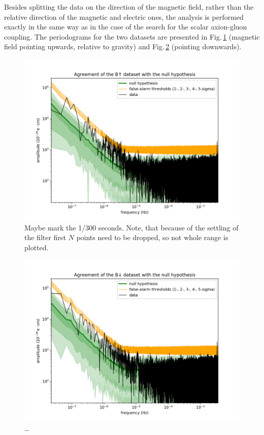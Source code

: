 Besides splitting the data on the direction of the magnetic field, rather than the relative direction of the magnetic and electric ones, the analysis is performed exactly in the same way as in the case of the search for the scalar axion-gluon coupling. The periodograms for the two datasets are presented in Fig.\,\ref{fig:axions_wind_Bup_detection} (magnetic field pointing upwards, relative to gravity) and Fig.\,\ref{fig:axions_wind_Bdown_detection} (pointing downwards).

\begin{figure}
  \centering
  \includegraphics[width=0.9\linewidth]{gfx/axions/winddeltah4mm_Bup_detection.png}
  \caption{Maybe mark the 1/300 seconds. Note, that because of the settling of the filter first $N$ points need to be dropped, so not whole range is plotted.}
  \label{fig:axions_wind_Bup_detection}
\end{figure}

\begin{figure}
  \centering
  \includegraphics[width=0.9\linewidth]{gfx/axions/winddeltah4mm_Bdown_detection.png}
  \caption{\ldots}
  \label{fig:axions_wind_Bdown_detection}
\end{figure}

